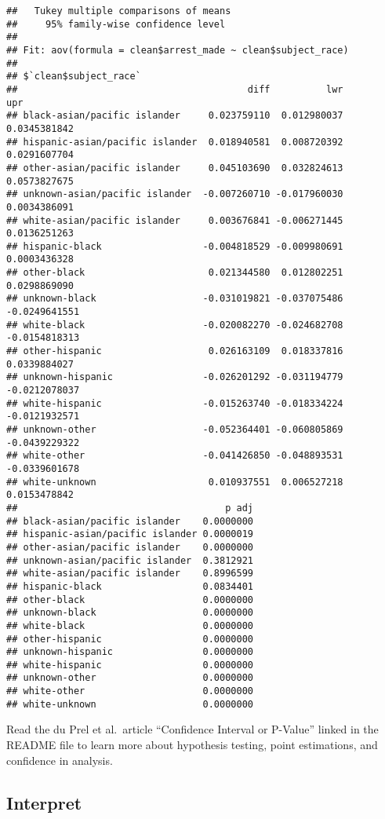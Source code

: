 \documentclass[
]{article}
\begin{document}
\begin{verbatim}
##   Tukey multiple comparisons of means
##     95% family-wise confidence level
## 
## Fit: aov(formula = clean$arrest_made ~ clean$subject_race)
## 
## $`clean$subject_race`
##                                         diff          lwr           upr
## black-asian/pacific islander     0.023759110  0.012980037  0.0345381842
## hispanic-asian/pacific islander  0.018940581  0.008720392  0.0291607704
## other-asian/pacific islander     0.045103690  0.032824613  0.0573827675
## unknown-asian/pacific islander  -0.007260710 -0.017960030  0.0034386091
## white-asian/pacific islander     0.003676841 -0.006271445  0.0136251263
## hispanic-black                  -0.004818529 -0.009980691  0.0003436328
## other-black                      0.021344580  0.012802251  0.0298869090
## unknown-black                   -0.031019821 -0.037075486 -0.0249641551
## white-black                     -0.020082270 -0.024682708 -0.0154818313
## other-hispanic                   0.026163109  0.018337816  0.0339884027
## unknown-hispanic                -0.026201292 -0.031194779 -0.0212078037
## white-hispanic                  -0.015263740 -0.018334224 -0.0121932571
## unknown-other                   -0.052364401 -0.060805869 -0.0439229322
## white-other                     -0.041426850 -0.048893531 -0.0339601678
## white-unknown                    0.010937551  0.006527218  0.0153478842
##                                     p adj
## black-asian/pacific islander    0.0000000
## hispanic-asian/pacific islander 0.0000019
## other-asian/pacific islander    0.0000000
## unknown-asian/pacific islander  0.3812921
## white-asian/pacific islander    0.8996599
## hispanic-black                  0.0834401
## other-black                     0.0000000
## unknown-black                   0.0000000
## white-black                     0.0000000
## other-hispanic                  0.0000000
## unknown-hispanic                0.0000000
## white-hispanic                  0.0000000
## unknown-other                   0.0000000
## white-other                     0.0000000
## white-unknown                   0.0000000
\end{verbatim}

Read the du Prel et al.~article ``Confidence Interval or P-Value''
linked in the README file to learn more about hypothesis testing, point
estimations, and confidence in analysis.

\hypertarget{interpret}{%
\subsection{Interpret}\label{interpret}}
\end{document}
